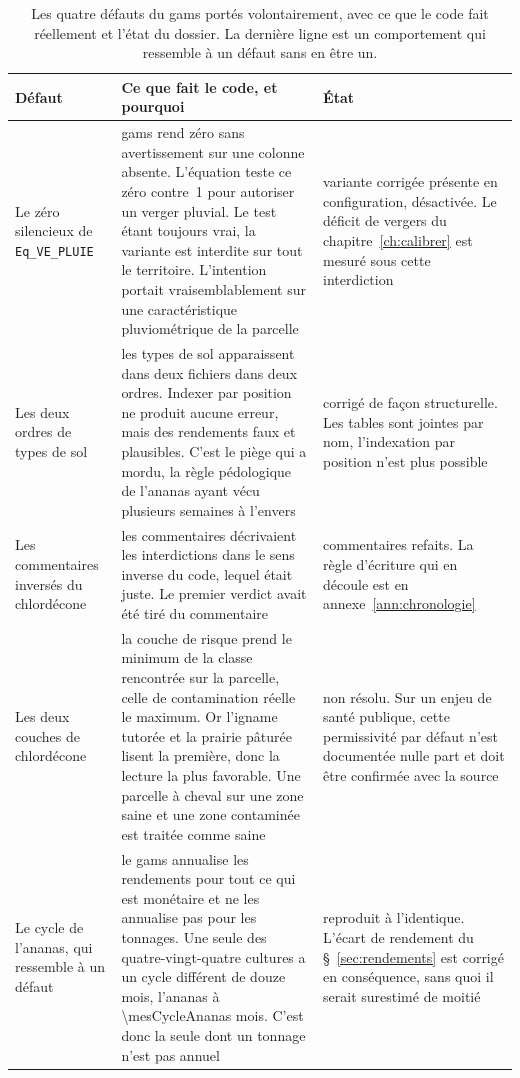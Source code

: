 \begin{table}[H]
  \centering
  \caption{Les quatre défauts du \gls{gams} portés volontairement, avec ce que le code fait
  réellement et l'état du dossier. La dernière ligne est un comportement qui ressemble à un
  défaut sans en être un.}
  \label{tab:ann-bugs}
  \scriptsize
  \setlength{\tabcolsep}{4pt}
  \begin{tabularx}{\textwidth}{@{}>{\raggedright\arraybackslash}p{27mm}X
                               >{\raggedright\arraybackslash}p{27mm}@{}}
    \toprule
    \textbf{Défaut} & \textbf{Ce que fait le code, et pourquoi} & \textbf{État} \\
    \midrule
    Le zéro silencieux de \texttt{Eq\_VE\_PLUIE} &
      \gls{gams} rend zéro sans avertissement sur une colonne absente. L'équation teste ce
      zéro contre~1 pour autoriser un verger pluvial. Le test étant toujours vrai, la variante
      est interdite sur tout le territoire. L'intention portait vraisemblablement sur une
      caractéristique pluviométrique de la parcelle &
      variante corrigée présente en configuration, désactivée. Le déficit de vergers du
      chapitre~\ref{ch:calibrer} est mesuré sous cette interdiction \\
    Les deux ordres de types de sol &
      les types de sol apparaissent dans deux fichiers dans deux ordres. Indexer par position
      ne produit aucune erreur, mais des rendements faux et plausibles. C'est le piège qui a
      mordu, la règle pédologique de l'ananas ayant vécu plusieurs semaines à l'envers &
      corrigé de façon structurelle. Les tables sont jointes par nom, l'indexation par
      position n'est plus possible \\
    Les commentaires inversés du chlordécone &
      les commentaires décrivaient les interdictions dans le sens inverse du code, lequel
      était juste. Le premier verdict avait été tiré du commentaire &
      commentaires refaits. La règle d'écriture qui en découle est en
      annexe~\ref{ann:chronologie} \\
    Les deux couches de chlordécone &
      la couche de risque prend le minimum de la classe rencontrée sur la parcelle, celle de
      contamination réelle le maximum. Or l'igname tutorée et la prairie pâturée lisent la
      première, donc la lecture la plus favorable. Une parcelle à cheval sur une zone saine et
      une zone contaminée est traitée comme saine &
      non résolu. Sur un enjeu de santé publique, cette permissivité par défaut n'est
      documentée nulle part et doit être confirmée avec la source \\
    \midrule
    Le cycle de l'ananas, qui ressemble à un défaut &
      le \gls{gams} annualise les rendements pour tout ce qui est monétaire et ne les
      annualise pas pour les tonnages. Une seule des quatre-vingt-quatre cultures a un cycle
      différent de douze mois, l'ananas à \num{\mesCycleAnanas} mois. C'est donc la seule dont
      un tonnage n'est pas annuel &
      reproduit à l'identique. L'écart de rendement du §~\ref{sec:rendements} est corrigé en
      conséquence, sans quoi il serait surestimé de moitié \\
    \bottomrule
  \end{tabularx}
\end{table}

